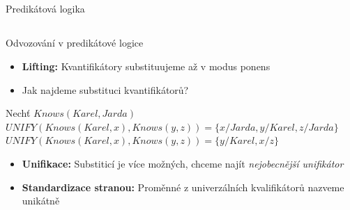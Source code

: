 \documentclass{beamer}
\begin{document}
\subsection{}
\begin{frame}{Predikátová logika}
\end{frame}

\subsection{}
\begin{frame}{Odvozování v predikátové logice}
\begin{itemize}
\item {\bf Lifting:} Kvantifikátory substituujeme až v modus ponens
\item Jak najdeme substituci kvantifikátorů?
\end{itemize}
\begin{center}
Nechť $Knows(Karel, Jarda)$
$UNIFY(Knows(Karel, x), Knows(y, z)) = \{ x/Jarda, y/Karel, z/Jarda \}$
$UNIFY(Knows(Karel, x), Knows(y, z)) = \{ y/Karel, x/z \}$
\end{center}
\begin{itemize}
\item {\bf Unifikace:} Substiticí je více možných, chceme najít {\em nejobecnější unifikátor}
\item {\bf Standardizace stranou:} Proměnné z univerzálních kvalifikátorů nazveme unikátně
\end{itemize}
\end{frame}
\end{document}
